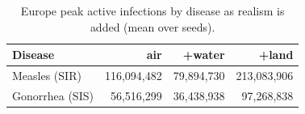 \begin{table}[t]
\centering
\caption{Europe peak active infections by disease as realism is added (mean over seeds).}
\label{tab:spread}
\begin{tabular}{lrrr}
\toprule
Disease & air & +water & +land \\
\midrule
Measles (SIR) & 116,094,482 & 79,894,730 & 213,083,906 \\
Gonorrhea (SIS) & 56,516,299 & 36,438,938 & 97,268,838 \\
\bottomrule
\end{tabular}
\end{table}
